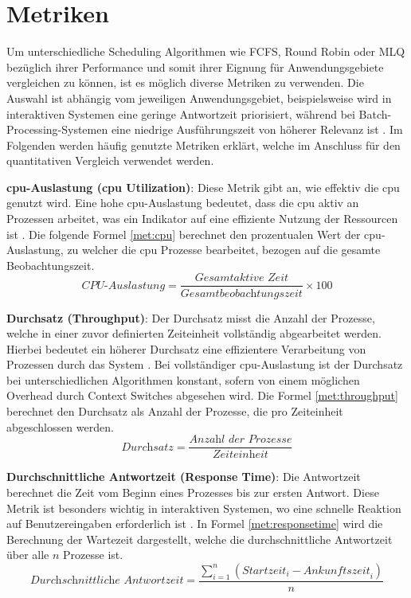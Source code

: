 
\section{Metriken}
Um unterschiedliche Scheduling Algorithmen wie \ac{FCFS}, Round Robin oder \ac{MLQ} bezüglich ihrer Performance und somit ihrer Eignung für Anwendungsgebiete vergleichen zu können, ist es möglich diverse Metriken zu verwenden. Die Auswahl ist abhängig vom jeweiligen Anwendungsgebiet, beispielsweise wird in interaktiven Systemen eine geringe Antwortzeit priorisiert, während bei Batch-Processing-Systemen eine niedrige Ausführungszeit von höherer Relevanz ist \autocite{thombare_efficient_2016}. Im Folgenden werden häufig genutzte Metriken erklärt, welche im Anschluss für den quantitativen Vergleich verwendet werden.


\textbf{\ac{cpu}-Auslastung (\ac{cpu} Utilization)}: Diese Metrik gibt an, wie effektiv die \ac{cpu} genutzt wird. Eine hohe \ac{cpu}-Auslastung bedeutet, dass die \ac{cpu} aktiv an Prozessen arbeitet, was ein Indikator auf eine effiziente Nutzung der Ressourcen ist \autocite{pemasinghe_comparison_2022}. Die folgende Formel \ref{met:cpu} berechnet den prozentualen Wert der \ac{cpu}-Auslastung, zu welcher die \ac{cpu} Prozesse bearbeitet, bezogen auf die gesamte Beobachtungszeit.
\begin{equation}
	\textit{CPU-Auslastung} = \frac{\textit{Gesamtaktive Zeit}}{\textit{Gesamtbeobachtungszeit}} \times 100
	\label{met:cpu}
\end{equation}


\textbf{Durchsatz (Throughput)}: Der Durchsatz misst die Anzahl der Prozesse, welche in einer zuvor definierten Zeiteinheit vollständig abgearbeitet werden. Hierbei bedeutet ein höherer Durchsatz eine effizientere Verarbeitung von Prozessen durch das System  \autocite{pemasinghe_comparison_2022}. Bei vollständiger \ac{cpu}-Auslastung ist der Durchsatz bei unterschiedlichen Algorithmen konstant, sofern von einem möglichen Overhead durch Context Switches abgesehen wird. Die Formel \ref{met:throughput} berechnet den Durchsatz als Anzahl der Prozesse, die pro Zeiteinheit abgeschlossen werden.
\begin{equation}
	\textit{Durchsatz} = \frac{\textit{Anzahl\ der\ Prozesse}}{\textit{Zeiteinheit}}
	\label{met:throughput}
\end{equation}


\textbf{Durchschnittliche Antwortzeit (Response Time)}: Die Antwortzeit berechnet die Zeit vom Beginn eines Prozesses bis zur ersten Antwort. Diese Metrik ist besonders wichtig in interaktiven Systemen, wo eine schnelle Reaktion auf Benutzereingaben erforderlich ist  \autocite{pemasinghe_comparison_2022}. In Formel \ref{met:responsetime} wird die Berechnung der Wartezeit dargestellt, welche die durchschnittliche Antwortzeit über alle \( n \) Prozesse ist.
\begin{equation}
	\textit{Durchschnittliche Antwortzeit} = \frac{\sum_{i=1}^{n} (\textit{Startzeit}_{i} - \textit{Ankunftszeit}_{i})}{n}
	\label{met:responsetime}
\end{equation}


